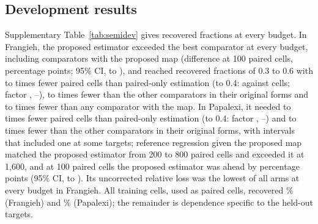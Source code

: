 \subsection*{Development results}
Supplementary Table~\ref{tab:semidev} gives recovered fractions at every budget. In Frangieh, the proposed estimator exceeded the best comparator at every budget, including comparators with the proposed map (difference at 100 paired cells, \SpFrBestDiffHundred{} percentage points; 95\% CI, \SpFrBestDiffHundredLo{} to \SpFrBestDiffHundredHi), and reached recovered fractions of 0.3 to 0.6 with \SpFrSavePairedOnlyMin{} to \SpFrSavePairedOnlyMax{} times fewer paired cells than paired-only estimation (to 0.4: \SpFrCellsFour{} against \SpFrPairedOnlyCellsFour{} cells; factor \SpFrSavePairedOnlyFour, \SpFrSavePairedOnlyFourLo--\SpFrSavePairedOnlyFourHi), \SpFrSavePublishedMin{} to \SpFrSavePublishedMax{} times fewer than the other comparators in their original forms and \SpFrSaveBestMin{} to \SpFrSaveBestMax{} times fewer than any comparator with the map. In Papalexi, it needed \SpPaSavePairedOnlyMin{} to \SpPaSavePairedOnlyMax{} times fewer paired cells than paired-only estimation (to 0.4: factor \SpPaSavePairedOnlyFour, \SpPaSavePairedOnlyFourLo--\SpPaSavePairedOnlyFourHi) and \SpPaSavePublishedMin{} to \SpPaSavePublishedMax{} times fewer than the other comparators in their original forms, with intervals that included one at some targets; reference regression given the proposed map matched the proposed estimator from 200 to 800 paired cells and exceeded it at 1,600, and at 100 paired cells the proposed estimator was ahead by \SpPaBestDiffHundred{} percentage points (95\% CI, \SpPaBestDiffHundredLo{} to \SpPaBestDiffHundredHi). \SpDevChampText{} Its uncorrected relative loss was the lowest of all arms at every budget in Frangieh. All training cells, used as paired cells, recovered \SpFrPairedAll\% (Frangieh) and \SpPaPairedAll\% (Papalexi); the remainder is dependence specific to the held-out targets.

\begin{table}[h]
\caption{\textbf{Recovered fraction (\%) of within-group cross-correlation in development, by number of paired cells.} Proposed, two-sided block shrinkage with the condition map; ablations change one component; comparator rows give the best of the listed fits at each budget (paired only: James--Stein, SCOSE, FCOSE and low rank, pooled or per condition; SemiCCA and reference regression: pooled or per condition); $^a$Lasso weight chosen per budget on the evaluation groups; Frangieh, 2 draws; Papalexi, \SpPaChampFolds{} of the held-out targets (\SpPaChampGroups{} groups), 1 draw. Other rows: Frangieh, \SpFrGroups{} groups, 10 draws; Papalexi, \SpPaGroups{} groups, 4 draws.}
\label{tab:semidev}
\centering\footnotesize

\end{table}

